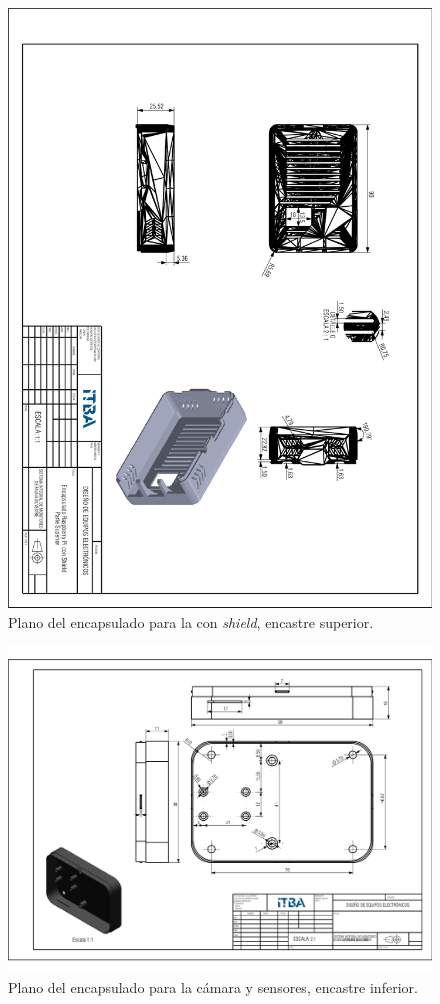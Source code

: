 \begin{figure}[H]
	\centering
	\includegraphics[width=\linewidth]{ImagenesApendice/RpiCasingTop}
	\caption{Plano del encapsulado para la \rspi con \textit{shield}, encastre superior.}
	\label{fig:RpiCasingTop}
\end{figure}

\begin{figure}[H]
	\centering
	\includegraphics[width=\linewidth]{ImagenesApendice/BasePlano}
	\caption{Plano del encapsulado para la cámara y sensores, encastre inferior.}
	\label{fig:BasePlano}
\end{figure}

